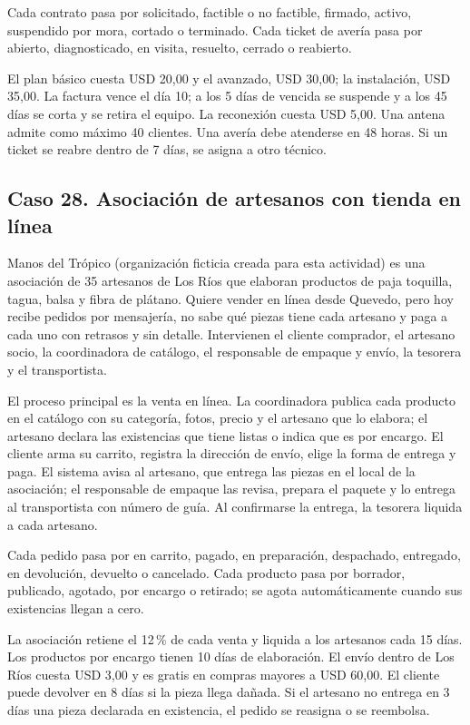 \documentclass[11pt]{article}
\newcommand{\subseccion}[1]{\subsection{\textcolor{midblue}{#1}}}
\begin{document}
Cada contrato pasa por solicitado, factible o no factible, firmado, activo, suspendido por mora, cortado o terminado. Cada ticket de avería pasa por abierto, diagnosticado, en visita, resuelto, cerrado o reabierto.

El plan básico cuesta USD 20,00 y el avanzado, USD 30,00; la instalación, USD 35,00. La factura vence el día 10; a los 5 días de vencida se suspende y a los 45 días se corta y se retira el equipo. La reconexión cuesta USD 5,00. Una antena admite como máximo 40 clientes. Una avería debe atenderse en 48 horas. Si un ticket se reabre dentro de 7 días, se asigna a otro técnico.

\subseccion{Caso 28. Asociación de artesanos con tienda en línea}
Manos del Trópico (organización ficticia creada para esta actividad) es una asociación de 35 artesanos de Los Ríos que elaboran productos de paja toquilla, tagua, balsa y fibra de plátano. Quiere vender en línea desde Quevedo, pero hoy recibe pedidos por mensajería, no sabe qué piezas tiene cada artesano y paga a cada uno con retrasos y sin detalle. Intervienen el cliente comprador, el artesano socio, la coordinadora de catálogo, el responsable de empaque y envío, la tesorera y el transportista.

El proceso principal es la venta en línea. La coordinadora publica cada producto en el catálogo con su categoría, fotos, precio y el artesano que lo elabora; el artesano declara las existencias que tiene listas o indica que es por encargo. El cliente arma su carrito, registra la dirección de envío, elige la forma de entrega y paga. El sistema avisa al artesano, que entrega las piezas en el local de la asociación; el responsable de empaque las revisa, prepara el paquete y lo entrega al transportista con número de guía. Al confirmarse la entrega, la tesorera liquida a cada artesano.

Cada pedido pasa por en carrito, pagado, en preparación, despachado, entregado, en devolución, devuelto o cancelado. Cada producto pasa por borrador, publicado, agotado, por encargo o retirado; se agota automáticamente cuando sus existencias llegan a cero.

La asociación retiene el 12\,\% de cada venta y liquida a los artesanos cada 15 días. Los productos por encargo tienen 10 días de elaboración. El envío dentro de Los Ríos cuesta USD 3,00 y es gratis en compras mayores a USD 60,00. El cliente puede devolver en 8 días si la pieza llega dañada. Si el artesano no entrega en 3 días una pieza declarada en existencia, el pedido se reasigna o se reembolsa.
\end{document}

